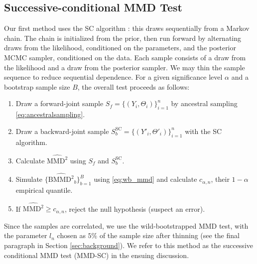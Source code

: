 \documentclass{article}
\begin{document}
\subsection{Successive-conditional MMD Test}
Our first method uses the SC algorithm \cite{geweke_getting_2004}:
this draws sequentially from a Markov chain. The chain is initialized from the prior, then run forward by alternating draws from the likelihood, conditioned on the parameters, and the posterior MCMC sampler, conditioned on the data. 
Each sample consists of a draw from the likelihood and a draw from the posterior sampler.
We may thin the sample sequence to reduce sequential dependence. 
For a given significance level $\alpha$ and a bootstrap sample size $B$, the overall test proceeds as follows: 
\begin{enumerate}
    \item Draw a forward-joint sample $S_f=\{(Y_i,\Theta_i)\}_{i=1}^n$ by ancestral sampling \eqref{eq:ancestralsampling}.
    \item Draw a backward-joint sample $S_{b}^{\mathrm{SC}}=\{(Y'_i, \Theta'_{i})\}_{i=1}^{n}$ with the SC algorithm.
    \item Calculate $\widehat{\mathrm{MMD}^2}$ using $S_f$ and $S_b^{\mathrm{SC}}$.
    \item Simulate $\{\widehat{\mathrm{BMMD}^2}_{b}\}_{b=1}^{B}$ using \eqref{eq:wb_mmd} and calculate $c_{\alpha, n}$, their $1-\alpha$ empirical quantile.
    \item If $\widehat{\mathrm{MMD}^2} \geq c_{\alpha, n}$, reject the null hypothesis (suspect an error).
\end{enumerate}
Since the samples are correlated, we use the wild-bootstrapped MMD test, with
the parameter $l_n$ chosen as $5\%$ of the sample size after thinning (see the final paragraph in Section \ref{sec:background}).
We refer to this method as the successive conditional MMD test (MMD-SC) in the ensuing discussion.
\end{document}
